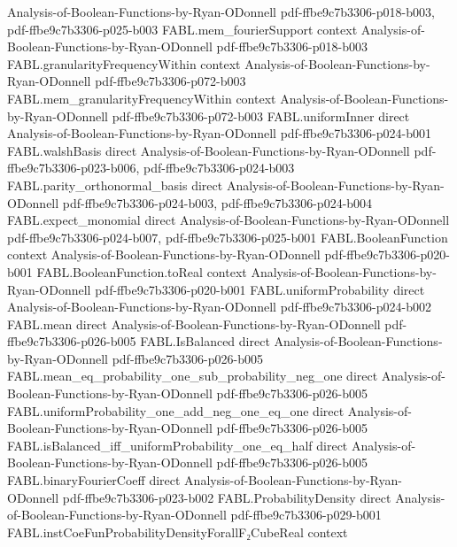 \begin{theorem}
  {Analysis-of-Boolean-Functions-by-Ryan-ODonnell}
  {pdf-ffbe9c7b3306-p018-b003,
    pdf-ffbe9c7b3306-p025-b003}
\proofstep
  {FABL.mem_fourierSupport}
  {context}
  {Analysis-of-Boolean-Functions-by-Ryan-ODonnell}
  {pdf-ffbe9c7b3306-p018-b003}
\proofstep
  {FABL.granularityFrequencyWithin}
  {context}
  {Analysis-of-Boolean-Functions-by-Ryan-ODonnell}
  {pdf-ffbe9c7b3306-p072-b003}
\proofstep
  {FABL.mem_granularityFrequencyWithin}
  {context}
  {Analysis-of-Boolean-Functions-by-Ryan-ODonnell}
  {pdf-ffbe9c7b3306-p072-b003}
\proofstep
  {FABL.uniformInner}
  {direct}
  {Analysis-of-Boolean-Functions-by-Ryan-ODonnell}
  {pdf-ffbe9c7b3306-p024-b001}
\proofstep
  {FABL.walshBasis}
  {direct}
  {Analysis-of-Boolean-Functions-by-Ryan-ODonnell}
  {pdf-ffbe9c7b3306-p023-b006,
    pdf-ffbe9c7b3306-p024-b003}
\proofstep
  {FABL.parity_orthonormal_basis}
  {direct}
  {Analysis-of-Boolean-Functions-by-Ryan-ODonnell}
  {pdf-ffbe9c7b3306-p024-b003,
    pdf-ffbe9c7b3306-p024-b004}
\proofstep
  {FABL.expect_monomial}
  {direct}
  {Analysis-of-Boolean-Functions-by-Ryan-ODonnell}
  {pdf-ffbe9c7b3306-p024-b007,
    pdf-ffbe9c7b3306-p025-b001}
\proofstep
  {FABL.BooleanFunction}
  {context}
  {Analysis-of-Boolean-Functions-by-Ryan-ODonnell}
  {pdf-ffbe9c7b3306-p020-b001}
\proofstep
  {FABL.BooleanFunction.toReal}
  {context}
  {Analysis-of-Boolean-Functions-by-Ryan-ODonnell}
  {pdf-ffbe9c7b3306-p020-b001}
\proofstep
  {FABL.uniformProbability}
  {direct}
  {Analysis-of-Boolean-Functions-by-Ryan-ODonnell}
  {pdf-ffbe9c7b3306-p024-b002}
\proofstep
  {FABL.mean}
  {direct}
  {Analysis-of-Boolean-Functions-by-Ryan-ODonnell}
  {pdf-ffbe9c7b3306-p026-b005}
\proofstep
  {FABL.IsBalanced}
  {direct}
  {Analysis-of-Boolean-Functions-by-Ryan-ODonnell}
  {pdf-ffbe9c7b3306-p026-b005}
\proofstep
  {FABL.mean_eq_probability_one_sub_probability_neg_one}
  {direct}
  {Analysis-of-Boolean-Functions-by-Ryan-ODonnell}
  {pdf-ffbe9c7b3306-p026-b005}
\proofstep
  {FABL.uniformProbability_one_add_neg_one_eq_one}
  {direct}
  {Analysis-of-Boolean-Functions-by-Ryan-ODonnell}
  {pdf-ffbe9c7b3306-p026-b005}
\proofstep
  {FABL.isBalanced_iff_uniformProbability_one_eq_half}
  {direct}
  {Analysis-of-Boolean-Functions-by-Ryan-ODonnell}
  {pdf-ffbe9c7b3306-p026-b005}
\proofstep
  {FABL.binaryFourierCoeff}
  {direct}
  {Analysis-of-Boolean-Functions-by-Ryan-ODonnell}
  {pdf-ffbe9c7b3306-p023-b002}
\proofstep
  {FABL.ProbabilityDensity}
  {direct}
  {Analysis-of-Boolean-Functions-by-Ryan-ODonnell}
  {pdf-ffbe9c7b3306-p029-b001}
\proofstep
  {FABL.instCoeFunProbabilityDensityForallF₂CubeReal}
  {context}

\end{theorem}
